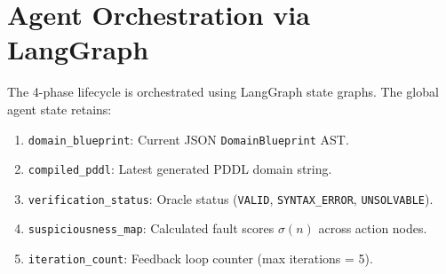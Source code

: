 \section{Agent Orchestration via LangGraph}
The 4-phase lifecycle is orchestrated using LangGraph state graphs. The global agent state retains:
\begin{enumerate}
    \item \texttt{domain\_blueprint}: Current JSON \texttt{DomainBlueprint} AST.
    \item \texttt{compiled\_pddl}: Latest generated PDDL domain string.
    \item \texttt{verification\_status}: Oracle status (\texttt{VALID}, \texttt{SYNTAX\_ERROR}, \texttt{UNSOLVABLE}).
    \item \texttt{suspiciousness\_map}: Calculated fault scores $\sigma(n)$ across action nodes.
    \item \texttt{iteration\_count}: Feedback loop counter (max iterations = 5).
\end{enumerate}
